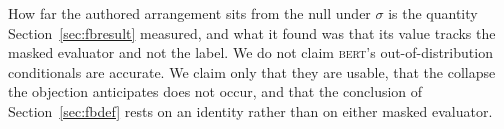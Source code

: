 How far the authored arrangement sits from the null under $\sigma$ is the
quantity Section~\ref{sec:fbresult} measured, and what it found was that
its value tracks the masked evaluator and not the label.  We do not claim
\textsc{bert}'s out-of-distribution conditionals are accurate.  We claim only
that they are usable, that the collapse the objection anticipates does not
occur, and that the conclusion of Section~\ref{sec:fbdef} rests on an
identity rather than on either masked evaluator.
